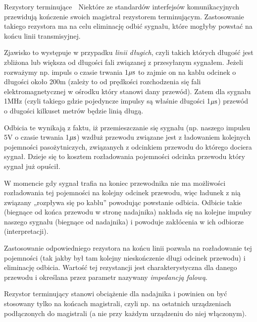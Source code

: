 \begin{ProTip}[breakable]{Rezystory terminujące {\Symbola 🤔}}
Niektóre  ze standardów interfejsów komunikacyjnych przewidują kończenie swoich magistral rezystorem terminującym.
Zastosowanie takiego rezystora ma na celu eliminację odbić sygnału, które mogłyby powstać na końcu linii transmisyjnej.

\vspace{7pt}

Zjawisko to występuje w przypadku \textit{linii długich}, czyli takich których długość jest zbliżona lub większa od długości fali związanej z przesyłanym sygnałem.
Jeżeli rozważymy np. impuls o czasie trwania 1$\mu \rm s$ to zajmie on na kablu odcinek o długości około 200m (zależy to od prędkości rozchodzenia się fali elektromagnetycznej w ośrodku który stanowi dany przewód).
Zatem dla sygnału 1MHz (czyli takiego gdzie pojedyncze impulsy są właśnie długości 1$\mu \rm s$) przewód o długości kilkuset metrów będzie linią długą.

\vspace{7pt}

Odbicia te wynikają z faktu, iż przemieszczanie się sygnału (np. naszego impulsu 5V o czasie trwania 1$\mu \rm s$) wzdłuż przewodu związane jest z
	ładowaniem kolejnych pojemności pasożytniczych, związanych z odcinkiem przewodu do którego dociera sygnał.
Dzieje się to kosztem rozładowania pojemności odcinka przewodu który sygnał już opuścił.

W momencie gdy sygnał trafia na koniec przewodnika nie ma możliwości rozładowania tej pojemności na kolejny odcinek przewodu, więc ładunek z nią związany „rozpływa się po kablu” powodując powstanie odbicia.
Odbicie takie (biegnące od końca przewodu w stronę nadajnika) nakłada się na kolejne impulsy naszego sygnału (biegnące od nadajnika) i powoduje zakłócenia w ich odbiorze (interpretacji).

Zastosowanie odpowiedniego rezystora na końcu linii pozwala na rozładowanie tej pojemności (tak jakby był tam kolejny nieskończenie długi odcinek przewodu) i eliminację odbicia.
Wartość tej rezystancji jest charakterystyczna dla danego przewodu i określana przez parametr nazywany \textit{impedancją falową}.

Rezystor terminujący stanowi obciążenie dla nadajnika i powinien on być stosowany tylko na końcach magistrali, czyli np. na ostatnich urządzeniach podłączonych do magistrali (a nie przy każdym urządzeniu do niej włączonym).

\vspace{7pt}


\end{ProTip}
